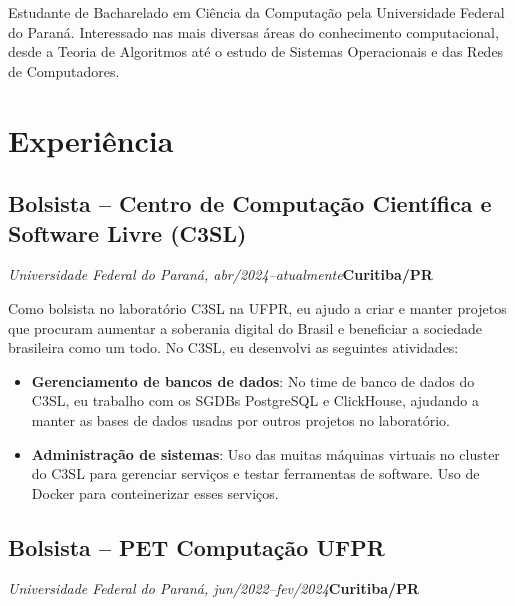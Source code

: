 \documentclass[a4paper, 12pt]{moderncv}
\begin{document}
\makecvtitle

\small{Estudante de Bacharelado em Ciência da Computação pela Universidade
Federal do Paraná. Interessado nas mais diversas áreas do conhecimento
computacional, desde a Teoria de Algoritmos até o estudo de Sistemas
Operacionais e das Redes de Computadores.}

\section{Experiência}
\vspace{1pt}
\subsection{\small{Bolsista -- Centro de Computação Científica e Software Livre (C3SL)}}
\textit{Universidade Federal do Paraná, abr/2024--atualmente}\hspace{150pt}\textbf{Curitiba/PR}

\vspace{3pt}
Como bolsista no laboratório C3SL na UFPR, eu ajudo a criar e manter projetos que procuram aumentar a soberania digital do Brasil e beneficiar a sociedade brasileira como um todo. No C3SL, eu desenvolvi as seguintes atividades:
\vspace{4pt}
\begin{itemize}
    \item{\textbf{Gerenciamento de bancos de dados}: No time de banco de dados
        do C3SL, eu trabalho com os SGDBs PostgreSQL e ClickHouse, ajudando a
    manter as bases de dados usadas por outros projetos no laboratório.}
\item{\textbf{Administração de sistemas}: Uso das muitas máquinas virtuais no
    cluster do C3SL para gerenciar serviços e testar ferramentas de software.
    Uso de Docker para conteinerizar esses serviços.}
\end{itemize}
\subsection{\small{Bolsista -- PET Computação UFPR}}
\textit{Universidade Federal do Paraná, jun/2022--fev/2024}\hspace{170pt}\textbf{Curitiba/PR}
\end{document}
